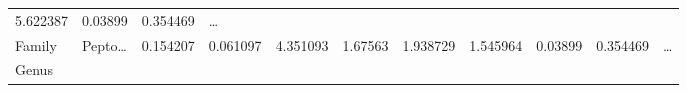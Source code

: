 \documentclass[
]{article}
\begin{document}
\begin{longtable}[]{@{}lllllllllll@{}}
\begin{minipage}[t]{0.06\columnwidth}
5.622387\strut
\end{minipage} & \begin{minipage}[t]{0.06\columnwidth}\raggedright
0.03899\strut
\end{minipage} & \begin{minipage}[t]{0.06\columnwidth}\raggedright
0.354469\strut
\end{minipage} & \begin{minipage}[t]{0.03\columnwidth}\raggedright
\ldots{}\strut
\end{minipage}\tabularnewline
\begin{minipage}[t]{0.06\columnwidth}\raggedright
Family\strut
\end{minipage} & \begin{minipage}[t]{0.06\columnwidth}\raggedright
Pepto\ldots{}\strut
\end{minipage} & \begin{minipage}[t]{0.09\columnwidth}\raggedright
0.154207\strut
\end{minipage} & \begin{minipage}[t]{0.06\columnwidth}\raggedright
0.061097\strut
\end{minipage} & \begin{minipage}[t]{0.09\columnwidth}\raggedright
4.351093\strut
\end{minipage} & \begin{minipage}[t]{0.06\columnwidth}\raggedright
1.67563\strut
\end{minipage} & \begin{minipage}[t]{0.09\columnwidth}\raggedright
1.938729\strut
\end{minipage} & \begin{minipage}[t]{0.06\columnwidth}\raggedright
1.545964\strut
\end{minipage} & \begin{minipage}[t]{0.06\columnwidth}\raggedright
0.03899\strut
\end{minipage} & \begin{minipage}[t]{0.06\columnwidth}\raggedright
0.354469\strut
\end{minipage} & \begin{minipage}[t]{0.03\columnwidth}\raggedright
\ldots{}\strut
\end{minipage}\tabularnewline
\begin{minipage}[t]{0.06\columnwidth}\raggedright
Genus\strut
\end{minipage} & \begin{minipage}[t]{0.06\columnwidth}\raggedright

\end{minipage}
\end{longtable}
\end{document}
